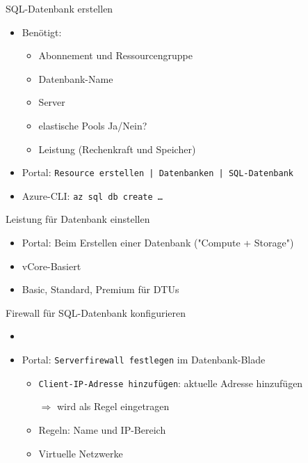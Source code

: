 \begin{flashcard}[Definition]{SQL-Datenbank erstellen}
    \begin{itemize}
        \item Benötigt:
            \begin{itemize}
                \item Abonnement und Ressourcengruppe
                \item Datenbank-Name
                \item Server
                \item elastische Pools Ja/Nein?
                \item Leistung (Rechenkraft und Speicher)
            \end{itemize}
        \item Portal: \texttt{Resource erstellen | Datenbanken | SQL-Datenbank}
        \item Azure-CLI:\newline
            \texttt{az sql db create \ldots}
    \end{itemize}
\end{flashcard}

\begin{flashcard}[Definition]{Leistung für Datenbank einstellen}
    \begin{itemize}
        \item Portal: Beim Erstellen einer Datenbank ("Compute + Storage")
        \item vCore-Basiert
        \item Basic, Standard, Premium für DTUs
    \end{itemize}
\end{flashcard}

\begin{flashcard}[Definition]{Firewall für SQL-Datenbank konfigurieren}
    \begin{itemize}
        \item
        \item Portal: \texttt{Serverfirewall festlegen} im Datenbank-Blade
        \begin{itemize}
            \item \texttt{Client-IP-Adresse hinzufügen}: aktuelle Adresse hinzufügen
            \item[$\Rightarrow$] wird als Regel eingetragen
            \item Regeln: Name und IP-Bereich
            \item Virtuelle Netzwerke
        \end{itemize}
    \end{itemize}
\end{flashcard}

